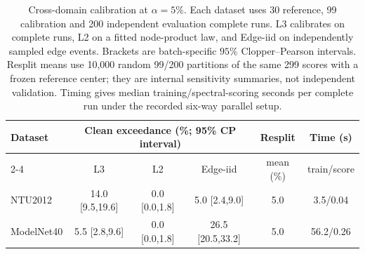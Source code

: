 \begin{table}[t]
\centering\small
\setlength{\tabcolsep}{3pt}
\begin{tabular}{lccccc}
\toprule
Dataset & \multicolumn{3}{c}{Clean exceedance (\%; 95\% CP interval)} & Resplit & Time (s) \\
\cmidrule(lr){2-4}
 & L3 & L2 & Edge-iid & mean (\%) & train/score \\
\midrule
NTU2012 & 14.0 [9.5,19.6] & 0.0 [0.0,1.8] & 5.0 [2.4,9.0] & 5.0 & 3.5/0.04 \\
ModelNet40 & 5.5 [2.8,9.6] & 0.0 [0.0,1.8] & 26.5 [20.5,33.2] & 5.0 & 56.2/0.26 \\
\bottomrule
\end{tabular}
\caption{Cross-domain calibration at $\alpha=5\%$. Each dataset uses
30 reference, 99 calibration and 200 independent evaluation complete
runs. L3 calibrates on complete runs, L2 on a fitted node-product law,
and Edge-iid on independently sampled edge events. Brackets are
batch-specific $95\%$ Clopper--Pearson intervals. Resplit means use
10,000 random 99/200 partitions of the same 299 scores with a frozen
reference center; they are internal sensitivity summaries, not
independent validation. Timing gives median training/spectral-scoring
seconds per complete run under the recorded six-way parallel setup.}
\label{tab:visual-alarm-validation}
\end{table}
